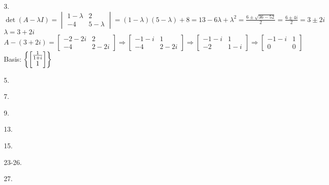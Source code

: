 \documentclass[leqno]{article}
\begin{document}
\begin{enumerate}
    \item[3.]
    $\displaystyle \det(A - \lambda I) = \begin{vmatrix}1 - \lambda & 2 \\ -4 & 5 - \lambda\end{vmatrix} = (1 - \lambda)(5 - \lambda) + 8 = 13 - 6\lambda + \lambda^2 = \frac{6 \pm \sqrt{36 - 52}}{2} = \frac{6 \pm 4i}{2} = 3 \pm 2i$\\
    $\lambda = 3 + 2i$\\
    $A - (3 + 2i) = \begin{bmatrix}-2 - 2i & 2 \\ -4 & 2 - 2i\end{bmatrix}
    \Rightarrow \begin{bmatrix}-1 - i & 1 \\ -4 & 2 - 2i\end{bmatrix}
    \Rightarrow \begin{bmatrix}-1 - i & 1 \\ -2 & 1 - i\end{bmatrix}
    \Rightarrow \begin{bmatrix}-1 - i & 1 \\ 0 & 0\end{bmatrix}$\\
    Basis: $\displaystyle \left\{\begin{bmatrix}\frac{1}{1 + i} \\ 1\end{bmatrix}\right\}$

    \item[5.]
    \item[7.]
    \item[9.]
    \item[13.]
    \item[15.]
    \item[23-26.]
    \item[27.]
\end{enumerate}
\end{document}
